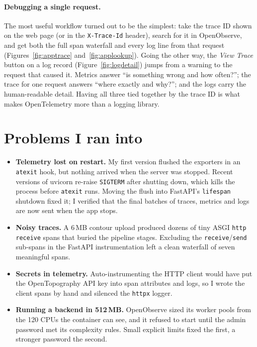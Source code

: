 \documentclass[11pt]{article}
\begin{document}
\paragraph{Debugging a single request.}
The most useful workflow turned out to be the simplest: take the trace ID shown on
the web page (or in the \texttt{X-Trace-Id} header), search for it in OpenObserve,
and get both the full span waterfall and every log line from that request
(Figures~\ref{fig:apptrace} and~\ref{fig:applookup}). Going the other way, the
\emph{View Trace} button on a log record (Figure~\ref{fig:logdetail}) jumps from a
warning to the request that caused it. Metrics
answer ``is something wrong and how often?''; the trace for one request answers
``where exactly and why?''; and the logs carry the human-readable detail. Having all
three tied together by the trace ID is what makes OpenTelemetry more than a logging
library.

\section{Problems I ran into}

\begin{itemize}
\item \textbf{Telemetry lost on restart.} My first version flushed the exporters in
an \texttt{atexit} hook, but nothing arrived when the server was stopped. Recent
versions of uvicorn re-raise \texttt{SIGTERM} after shutting down, which kills the
process before \texttt{atexit} runs. Moving the flush into FastAPI's
\texttt{lifespan} shutdown fixed it; I verified that the final batches of traces,
metrics and logs are now sent when the app stops.
\item \textbf{Noisy traces.} A 6\,MB contour upload produced dozens of tiny ASGI
\texttt{http receive} spans that buried the pipeline stages. Excluding the
\texttt{receive}/\texttt{send} sub-spans in the FastAPI instrumentation left a clean
waterfall of seven meaningful spans.
\item \textbf{Secrets in telemetry.} Auto-instrumenting the HTTP client would have
put the OpenTopography API key into span attributes and logs, so I wrote the client
spans by hand and silenced the \texttt{httpx} logger.
\item \textbf{Running a backend in 512\,MB.} OpenObserve sized its worker pools from
the 120 CPUs the container can see, and it refused to start until the admin password
met its complexity rules. Small explicit limits fixed the first, a stronger password
the second.
\end{itemize}
\end{document}
